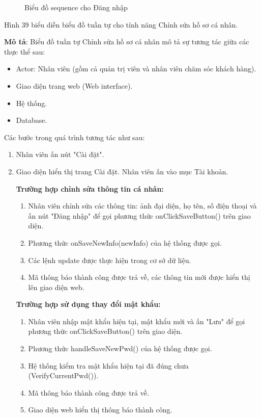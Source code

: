\begin{figure}[H]
	\centering
	
	\vspace{0.5cm}
	\caption{Biểu đồ sequence cho Đăng nhập}
	\label{fig:enter-label}
\end{figure}




Hình 39 biểu diễn biểu đồ tuần tự cho tính năng Chỉnh sửa hồ sơ cá nhân.

\textbf{Mô tả}: Biểu đồ tuần tự Chỉnh sửa hồ sơ cá nhân mô tả sự tương tác giữa các thực thể sau:
\begin{itemize}
	\item Actor: Nhân viên (gồm cả quản trị viên và nhân viên chăm sóc khách hàng).
	\item Giao diện trang web (Web interface).
	\item Hệ thống.
	\item Database.
\end{itemize}
Các bước trong quá trình tương tác như sau:
\begin{enumerate}
	\item Nhân viên ấn nút "Cài đặt".
	\item Giao diện hiển thị trang Cài đặt. Nhân viên ấn vào mục Tài khoản.
	
	\textbf{Trường hợp chỉnh sửa thông tin cá nhân:}
	\begin{enumerate}
		\item Nhân viên chỉnh sửa các thông tin: ảnh đại diện, họ tên, số điện thoại và ấn nút "Đăng nhập" để gọi phương thức onClickSaveButton() trên giao diện. 
		\item Phương thức onSaveNewInfo(newInfo) của hệ thống được gọi.
		\item Các lệnh update được thực hiện trong cơ sở dữ liệu.
		\item Mã thông báo thành công được trả về, các thông tin mới được hiển thị lên giao diện web.
	\end{enumerate}
	
	\textbf{Trường hợp sử dụng thay đổi mật khẩu:}
	\begin{enumerate}
		\item Nhân viên nhập mật khẩu hiện tại, mật khẩu mới và ấn "Lưu" để gọi phương thức onClickSaveButton() trên giao diện. 
		\item Phương thức handleSaveNewPwd() của hệ thống được gọi.
		\item Hệ thống kiểm tra mật khẩu hiện tại đã đúng chưa (VerifyCurrentPwd()).
		\item Mã thông báo thành công được trả về.
		\item Giao diện web hiển thị thông báo thành công.
	\end{enumerate}
\end{enumerate}

